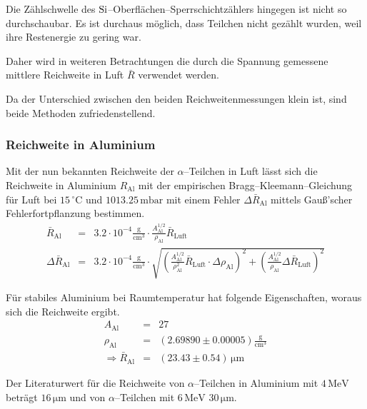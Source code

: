 \documentclass[12pt,a4paper]{scrartcl}
\numberwithin{equation}{section} %
\begin{document}
Die Zählschwelle des $\ce{Si}$--Oberflächen--Sperrschichtzählers hingegen ist nicht so durchschaubar. Es ist durchaus möglich, dass Teilchen nicht gezählt wurden, weil ihre Restenergie zu gering war.

Daher wird in weiteren Betrachtungen die durch die Spannung gemessene mittlere Reichweite in Luft $\bar R$ verwendet werden.

Da der Unterschied zwischen den beiden Reichweitenmessungen klein ist, sind beide Methoden zufriedenstellend.

\hypertarget{Reichweite-Aluminium}{%
	\subsubsection{Reichweite in Aluminium}\label{Reichweite-Aluminium}}

Mit der nun bekannten Reichweite der $\alpha$--Teilchen in Luft lässt sich die Reichweite in Aluminium $R_\mathrm{Al}$ mit der empirischen Bragg--Kleemann--Gleichung für Luft bei $15\mathrm{\,^\circ C}$ und $1013.25 \mathrm{\, mbar}$ mit einem Fehler $\Delta \bar{R}_\mathrm{Al}$ mittels Gauß'scher Fehlerfortpflanzung bestimmen.
\begin{eqnarray}
	\bar{R}_\mathrm{Al} &=& 3.2 \cdot 10^{-4} \mathrm{\frac{g}{cm^3}}
		\cdot \frac{A_\mathrm{Al}^{1/2}}{\rho_\mathrm{Al}} \bar{R}_\mathrm{Luft} \\
	\Delta \bar{R}_\mathrm{Al} &=& 3.2 \cdot 10^{-4} \mathrm{\frac{g}{cm^3}} \cdot
		\sqrt{
				\left(\frac{A_\mathrm{Al}^{1/2}}{\rho_\mathrm{Al}^2}\bar{R}_\mathrm{Luft} \cdot \Delta \rho_\mathrm{Al} \right)^2
				+ \left( \frac{A_\mathrm{Al}^{1/2}}{\rho_\mathrm{Al}} \Delta \bar{R}_\mathrm{Luft}\right)^2
		}
\end{eqnarray}

\noindent
Für stabiles Aluminium bei Raumtemperatur hat folgende Eigenschaften, \cite{NIST_Al} woraus sich die Reichweite ergibt.
\begin{eqnarray}
	A_\mathrm{Al} &=& 27 \\
	\rho_\mathrm{Al} &=& (2.69890 \pm 0.00005) \mathrm{\frac{g}{cm^3}} \\
	\Rightarrow \bar{R}_\mathrm{Al} &=& (23.43 \pm 0.54) \mathrm{\, \mu m}
\end{eqnarray}

\noindent
Der Literaturwert für die Reichweite von $\alpha$--Teilchen in Aluminium mit $4 \mathrm{\, MeV}$ beträgt $16 \mathrm{\, \mu m}$ und von $\alpha$--Teilchen mit $6 \mathrm{\, MeV}$ $30 \mathrm{\, \mu m}$. \cite{LEIFIphysik Alphazerfall }
\end{document}
